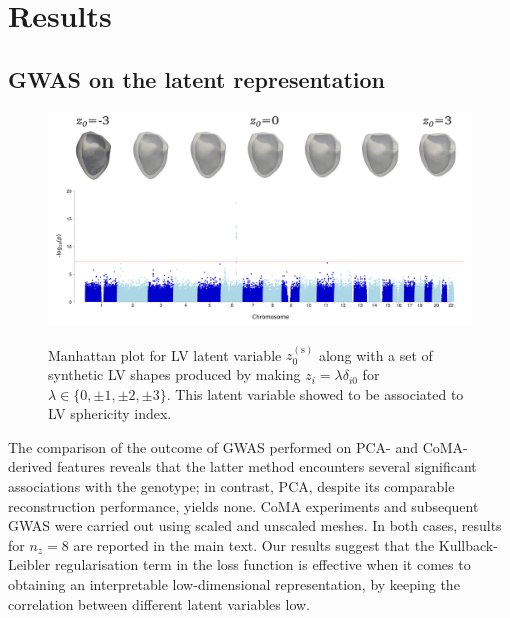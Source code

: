 \section*{Results}
\subsection*{GWAS on the latent representation}
\label{subsec_GWAS}

\begin{figure}[ht!]
\includegraphics[width=\textwidth]{figs/gwas/GWAS_Experiment1_z0_scaled_meshes.png}
\label{fig:manhattan_LV_latent}
\caption{Manhattan plot for LV latent variable $z_0^{(\text{s})}$ along with a set of synthetic LV shapes produced by making $z_i=\lambda \delta_{i0}$ for $\lambda\in\{0, \pm 1, \pm 2, \pm 3\}$. This latent variable showed to be associated to LV sphericity index.}
\end{figure}

The comparison of the outcome of GWAS performed on PCA- and CoMA-derived features reveals that the latter method encounters several significant associations with the genotype; in contrast, PCA, despite its comparable reconstruction performance, yields none. %
CoMA experiments and subsequent GWAS were carried out using scaled and unscaled meshes. In both cases, results for $n_z=8$ are reported in the main text. Our results suggest that the Kullback-Leibler regularisation term in the loss function is effective when it comes to obtaining an interpretable low-dimensional representation, by keeping the correlation between different latent variables low. %

